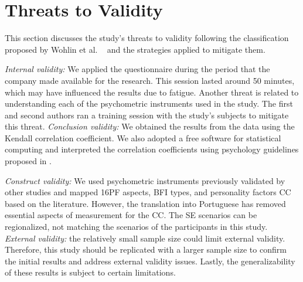 \section{Threats to Validity}
\label{THREATS TO VALIDITY}

This section discusses the study's threats to validity following the classification proposed by Wohlin et al. ~\cite{wohlin2012experimentation} and the strategies applied to mitigate them.

\textit{Internal validity:} We applied the questionnaire during the period that the company made available for the research. This session lasted around 50 minutes, which may have influenced the results due to fatigue. Another threat is related to understanding each of the psychometric instruments used in the study. The first and second authors ran a training session with the study's subjects to mitigate this threat. \textit{Conclusion validity:} We obtained the results from the data using the Kendall correlation coefficient. We also adopted a free software for statistical computing and interpreted the correlation coefficients using psychology guidelines proposed in \cite{dancey2007statistics}. 

\textit{Construct validity:} We used psychometric instruments previously validated by other studies and mapped 16PF aspects, BFI types, and personality factors CC based on the literature. However, the translation into Portuguese has removed essential aspects of measurement for the CC. The SE scenarios can be regionalized, not matching the scenarios of the participants in this study. \textit{External validity:} the relatively small sample size could limit external validity. Therefore, this study should be replicated with a larger sample size to confirm the initial results and address external validity issues. Lastly, the generalizability of these results is subject to certain limitations.

